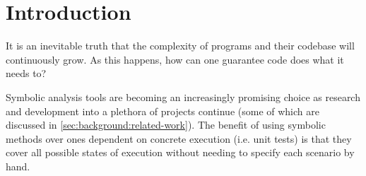 
\chapter{Introduction}
\label{sec:intro}




It is an inevitable truth that the complexity of programs and their codebase
will continuously grow. As this happens, how can one guarantee code does what
it needs to?


Symbolic analysis tools are becoming an increasingly promising choice as
research and development into a plethora of projects continue (some of which
are discussed in \autoref{sec:background:related-work}). The benefit of using
symbolic methods over ones dependent on concrete execution (i.e. unit tests) is
that they cover all possible states of execution without needing to specify each
scenario by hand.


